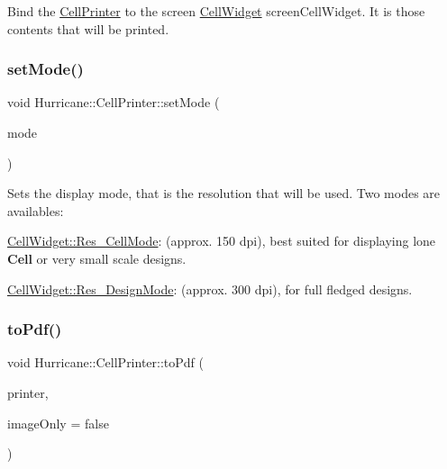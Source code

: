 Bind the \hyperlink{classHurricane_1_1CellPrinter}{Cell\+Printer} to the screen \hyperlink{classHurricane_1_1CellWidget}{Cell\+Widget} {\ttfamily screen\+Cell\+Widget}. It is those contents that will be printed. \mbox{\label{classHurricane_1_1CellPrinter_a27a285de4f74f07f78e16cc101f05ef7}} 
\subsubsection{\texorpdfstring{set\+Mode()}{setMode()}}
{\footnotesize\ttfamily void Hurricane\+::\+Cell\+Printer\+::set\+Mode (\begin{DoxyParamCaption}\item[{int}]{mode }\end{DoxyParamCaption})\hspace{0.3cm}{\ttfamily [inline]}}

Sets the display mode, that is the resolution that will be used. Two modes are availables\+: 
\begin{DoxyItemize}
\item \hyperlink{classHurricane_1_1CellWidget_a4b81fed78775d491c169b649870d9dd7af37fd1c10fd363f0ad04a94dbccd5789}{Cell\+Widget\+::\+Res\+\_\+\+Cell\+Mode}\+: (approx. 150 dpi), best suited for displaying lone \textbf{ Cell} or very small scale designs. 
\item \hyperlink{classHurricane_1_1CellWidget_a4b81fed78775d491c169b649870d9dd7a0c7c9bd939930fe178b5b8bcd84bdc1e}{Cell\+Widget\+::\+Res\+\_\+\+Design\+Mode}\+: (approx. 300 dpi), for full fledged designs. 
\end{DoxyItemize}\mbox{\label{classHurricane_1_1CellPrinter_ac595a0549c1086ab92a3bc56609246ac}} 
\subsubsection{\texorpdfstring{to\+Pdf()}{toPdf()}}
{\footnotesize\ttfamily void Hurricane\+::\+Cell\+Printer\+::to\+Pdf (\begin{DoxyParamCaption}\item[{Q\+Printer $\ast$}]{printer,  }\item[{bool}]{image\+Only = {\ttfamily false} }\end{DoxyParamCaption})}


